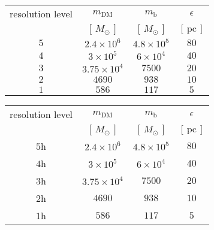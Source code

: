\documentclass[a4paper,fleqn,usenatbib]{mnras}
\begin{document}
\begin{table}
\begin{tabular}{cccc}
resolution level & $m_{\text{DM}}$      & $m_{\text{b}}$    & $\epsilon$        \\
                 & $[\,M_{\odot}\,]$    & $[\,M_{\odot}\,]$ & $[\,\text{pc}\,]$ \\
$5$              & $2.4\times10^6$      & $4.8\times10^5$   & $80$             \\
$4$              & $3\times10^5$        & $6\times10^4$     & $40$             \\
$3$              & $3.75 \times 10^{4}$ & $7500$            & $20$             \\
$2$              & $4690$               & $938$             & $10$            \\
$1$              & $586$                & $117$             & $5$           
\end{tabular}
\end{table}

\begin{table}
\begin{tabular}{cccc}
resolution level & $m_{\text{DM}}$      & $m_{\text{b}}$    & $\epsilon$        \\
                 & $[\,M_{\odot}\,]$    & $[\,M_{\odot}\,]$ & $[\,\text{pc}\,]$ \\
$5$h             & $2.4\times10^6$      & $4.8\times10^5$   & $80$             \\
$4$h             & $3\times10^5$        & $6\times10^4$     & $40$             \\
$3$h             & $3.75 \times 10^{4}$ & $7500$            & $20$             \\
$2$h             & $4690$               & $938$             & $10$            \\
$1$h             & $586$                & $117$             & $5$           
\end{tabular}
\end{table}




\bsp	%
\label{lastpage}
\end{document}
